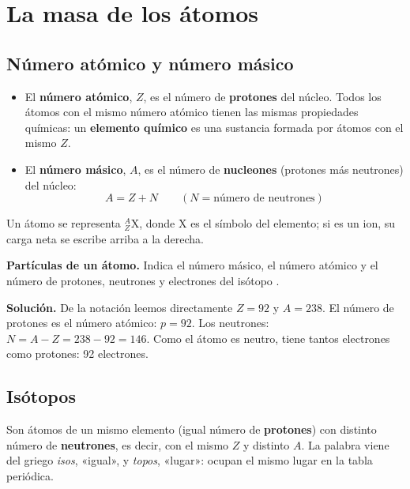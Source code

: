 \section{La masa de los átomos}\label{sec:ud3-masa}

\subsection{Número atómico y número másico}

\begin{definition}
    \leavevmode %
    \begin{itemize}
        \item El \textbf{número atómico}, \(Z\), es el número de \textbf{protones} del núcleo. Todos los átomos con el mismo
        número atómico tienen las mismas propiedades químicas: un \textbf{elemento químico} es una sustancia formada por átomos con
        el mismo \(Z\).
        \item El \textbf{número másico}, \(A\), es el número de \textbf{nucleones} (protones más neutrones) del núcleo:
        \[ A = Z + N \qquad (N = \text{número de neutrones}) \]
    \end{itemize}
    Un átomo se representa \(^{A}_{Z}\mathrm{X}\), donde X es el símbolo del elemento; si es un ion, su carga neta se escribe
    arriba a la derecha.
\end{definition}

\begin{example}
    \textbf{Partículas de un átomo.} Indica el número másico, el número atómico y el número de protones, neutrones y electrones
    del isótopo .

    \textbf{Solución.} De la notación leemos directamente \(Z = 92\) y \(A = 238\). El número de protones es el número atómico:
    \(p = 92\). Los neutrones: \(N = A - Z = 238 - 92 = 146\). Como el átomo es neutro, tiene tantos electrones como protones:
    92 electrones.
\end{example}

\subsection{Isótopos}

\begin{definition}[Isótopos]
    Son átomos de un mismo elemento (igual número de \textbf{protones}) con distinto número de \textbf{neutrones}, es decir,
    con el mismo \(Z\) y distinto \(A\). La palabra viene del griego \emph{isos}, «igual», y \emph{topos}, «lugar»: ocupan el
    mismo lugar en la tabla periódica.
\end{definition}

